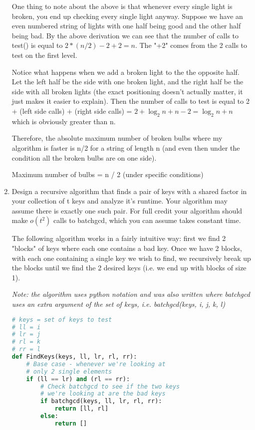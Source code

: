 \documentclass[11pt, letterpaper]{article}
\begin{document}
\begin{enumerate}[label=(\alph*)]
\quad One thing to note about the above is that whenever every single light is broken, you end up checking every single light anyway. Suppose we have an even numbered string of lights with one half being good and the other half being bad. By the above derivation we can see that the number of calls to test() is equal to $2 * (n / 2) - 2 + 2 = n$. The "+2" comes from the 2 calls to test on the first level.

\quad Notice what happens when we add a broken light to the the opposite half. Let the left half be the side with one broken light, and the right half be the side with all broken lights (the exact positioning doesn't actually matter, it just makes it easier to explain). Then the number of calls to test is equal to 2 + (left side calls) + (right side calls) = $ 2 + \log_2 n + n - 2 = \log_2 n + n $ which is obviously greater than n. 

\quad Therefore, the absolute maximum number of broken bulbs where my algorithm is faster is n/2 for a string of length n (and even then under the condition all the broken bulbs are on one side).

\begin{center}
Maximum number of bulbs = n / 2 (under specific conditions)
\end{center}

\pagebreak

\item Design a recursive algorithm that finds a pair of keys with a shared factor in your collection of t keys and analyze it's runtime. Your algorithm may assume there is exactly one such pair. For full credit your algorithm should make $o(t^2)$ calls to batchgcd, which you can assume takes constant time.

\quad The following algorithm works in a fairly intuitive way: first we find 2 "blocks" of keys where each one contains a bad key. Once we have 2 blocks, with each one containing a single key we wish to find, we recursively break up the blocks until we find the 2 desired keys (i.e. we end up with blocks of size 1).

\textit{Note: the algorithm uses python notation and was also written where batchgcd uses an extra argument of the set of keys, i.e. batchgcd(keys, i, j, k, l)}

\begin{lstlisting}[language=python]
# keys = set of keys to test
# ll = i
# lr = j
# rl = k
# rr = l
def FindKeys(keys, ll, lr, rl, rr):
    # Base case - whenever we're looking at
    # only 2 single elements
    if (ll == lr) and (rl == rr):
        # Check batchgcd to see if the two keys
        # we're looking at are the bad keys
        if batchgcd(keys, ll, lr, rl, rr):
            return [ll, rl]
        else:
            return []
        

\end{lstlisting}
\end{enumerate}
\end{document}
